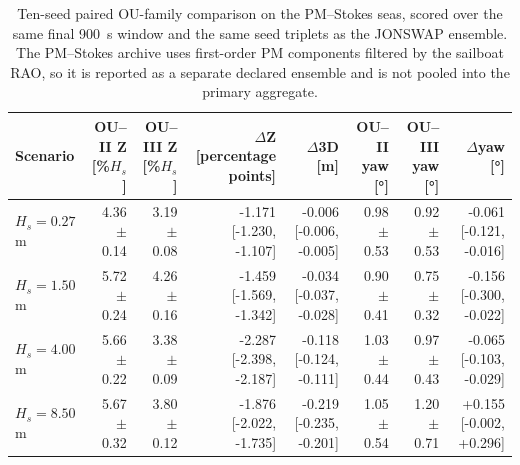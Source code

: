 \begin{table}[t]
  \centering
  \caption{Ten-seed paired OU-family comparison on the PM--Stokes seas, scored over the same final \SI{900}{s} window and the same seed triplets as the JONSWAP ensemble. The PM--Stokes archive uses first-order PM components filtered by the sailboat RAO, so it is reported as a separate declared ensemble and is not pooled into the primary aggregate.}
  \label{tab:ou_mc_pmstokes}
  \footnotesize
  \setlength{\tabcolsep}{4.0pt}
  \begin{tabular}{@{}lrrrrrrr@{}}
    \toprule
    Scenario & OU--II Z [\%$H_s$] & OU--III Z [\%$H_s$] & $\Delta$Z [percentage points] & $\Delta$3D [m] & OU--II yaw [\si{\degree}] & OU--III yaw [\si{\degree}] & $\Delta$yaw [\si{\degree}] \\
    \midrule
    $H_s=0.27$ m & 4.36 $\pm$ 0.14 & 3.19 $\pm$ 0.08 & -1.171 [-1.230, -1.107] & -0.006 [-0.006, -0.005] & 0.98 $\pm$ 0.53 & 0.92 $\pm$ 0.53 & -0.061 [-0.121, -0.016] \\
    $H_s=1.50$ m & 5.72 $\pm$ 0.24 & 4.26 $\pm$ 0.16 & -1.459 [-1.569, -1.342] & -0.034 [-0.037, -0.028] & 0.90 $\pm$ 0.41 & 0.75 $\pm$ 0.32 & -0.156 [-0.300, -0.022] \\
    $H_s=4.00$ m & 5.66 $\pm$ 0.22 & 3.38 $\pm$ 0.09 & -2.287 [-2.398, -2.187] & -0.118 [-0.124, -0.111] & 1.03 $\pm$ 0.44 & 0.97 $\pm$ 0.43 & -0.065 [-0.103, -0.029] \\
    $H_s=8.50$ m & 5.67 $\pm$ 0.32 & 3.80 $\pm$ 0.12 & -1.876 [-2.022, -1.735] & -0.219 [-0.235, -0.201] & 1.05 $\pm$ 0.54 & 1.20 $\pm$ 0.71 & +0.155 [-0.002, +0.296] \\
    \bottomrule
  \end{tabular}
\end{table}


